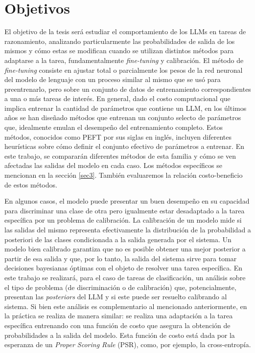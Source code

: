 \documentclass[a4paper,11pt,titlepage]{article}
\begin{document}
\section{Objetivos}\label{sec2}

El objetivo de la tesis será estudiar el comportamiento de los LLMs en tareas de razonamiento, analizando particularmente las probabilidades de salida de los mismos y cómo estas se modifican cuando se utilizan distintos métodos para adaptarse a la tarea, fundamentalmente \emph{fine-tuning} y calibración. El método de \textit{fine-tuning} consiste en ajustar total o parcialmente los pesos de la red neuronal del modelo de lenguaje con un proceso similar al mismo que se usó para preentrenarlo, pero sobre un conjunto de datos de entrenamiento correspondientes a una o más tareas de interés. En general, dado el costo computacional que implica entrenar la cantidad de parámetros que contiene un LLM, en los últimos años se han diseñado métodos que entrenan un conjunto selecto de parámetros que, idealmente emulan el desempeño del entrenamiento completo. Estos métodos, conocidos como PEFT por sus siglas en inglés, incluyen diferentes heurísticas sobre cómo definir el conjunto efectivo de parámetros a entrenar. En este trabajo, se compararán diferentes métodos de esta familia y cómo se ven afectadas las salidas del modelo en cada caso. Los métodos específicos se mencionan en la sección \ref{sec3}. También evaluaremos la relación costo-beneficio de estos métodos. 

En algunos casos, el modelo puede presentar un buen desempeño en su capacidad para discriminar una clase de otra pero igualmente estar desadaptado a la tarea específica por un problema de calibración. La calibración de un modelo mide si las salidas del mismo representa efectivamente la distribución de la probabilidad a posteriori de las clases condicionada a la salida generada por el sistema. Un modelo bien calibrado garantiza que no es posible obtener una mejor posterior a partir de esa salida y que, por lo tanto, la salida del sistema sirve para tomar decisiones bayesianas óptimas con el objeto de resolver una tarea específica. En este trabajo se realizará, para el caso de tareas de clasificación, un análisis sobre el tipo de problema (de discriminación o de calibración) que, potencialmente, presentan las \textit{posteriors} del LLM y si este puede ser resuelto calibrando al sistema. Si bien este análisis es complementario al mencionado anteriormente, en la práctica se realiza de manera similar: se realiza una adaptación a la tarea específica entrenando con una función de costo que asegura la obtención de probabilidades a la salida del modelo. Esta función de costo está dada por la esperanza de un \emph{Proper Scoring Rule} (PSR), como, por ejemplo, la cross-entropía.
\end{document}
